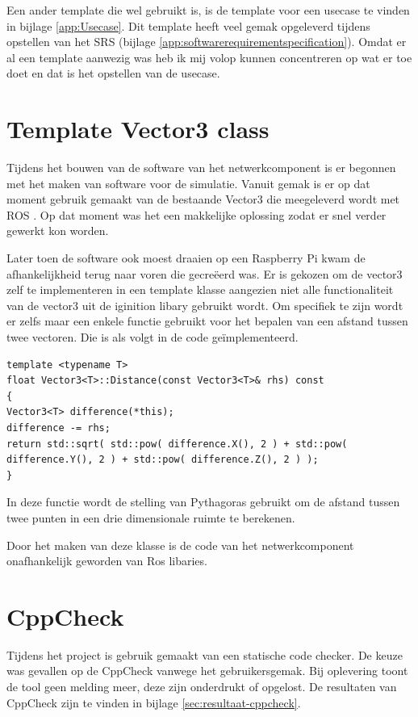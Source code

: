 \documentclass[a4paper, 11pt, oneside]{report}
\begin{document}
Een ander template die wel gebruikt is, is de template voor een usecase te vinden in bijlage \ref{app:Usecase}.
Dit template heeft veel gemak opgeleverd tijdens opstellen van het SRS (bijlage \ref{app:softwarerequirementspecification}). 
Omdat er al een template aanwezig was heb ik mij volop kunnen concentreren op wat er toe doet en dat is het opstellen van de usecase. 



\section{Template Vector3 class}

Tijdens het bouwen van de software van het netwerkcomponent is er begonnen met het maken van software voor de simulatie.
Vanuit gemak is er op dat moment gebruik gemaakt van de bestaande Vector3 die meegeleverd wordt met ROS \cite{ignitionVector}.
Op dat moment was het een makkelijke oplossing zodat er snel verder gewerkt kon worden. 

Later toen de software ook moest draaien op een Raspberry Pi kwam de afhankelijkheid terug naar voren die gecreëerd was.
Er is gekozen om de vector3 zelf te implementeren in een template klasse aangezien niet alle functionaliteit van de vector3 uit de iginition libary\cite{ignitionVector} gebruikt wordt.
Om specifiek te zijn wordt er zelfs maar een enkele functie gebruikt voor het bepalen van een afstand tussen twee vectoren.
Die is als volgt in de code geïmplementeerd. 

\begin{lstlisting}
template <typename T>
float Vector3<T>::Distance(const Vector3<T>& rhs) const
{
Vector3<T> difference(*this);
difference -= rhs;
return std::sqrt( std::pow( difference.X(), 2 ) + std::pow( difference.Y(), 2 ) + std::pow( difference.Z(), 2 ) );
}
\end{lstlisting}

In deze functie wordt de stelling van Pythagoras gebruikt om de afstand tussen twee punten in een drie dimensionale ruimte te berekenen.

Door het maken van deze klasse is de code van het netwerkcomponent onafhankelijk geworden van Ros libaries.

\section{CppCheck}
Tijdens het project is gebruik gemaakt van een statische code checker.
De keuze was gevallen op de CppCheck vanwege het gebruikersgemak.
Bij oplevering toont de tool geen melding meer, deze zijn onderdrukt of opgelost.
De resultaten van CppCheck zijn te vinden in bijlage \ref{sec:resultaat-cppcheck}.
\end{document}
